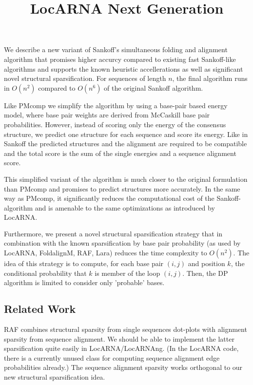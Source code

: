 \documentclass{article}
\title{LocARNA Next Generation}
\begin{document}
\maketitle

We describe a new variant of Sankoff's simultaneous folding and
alignment algorithm that promises higher accurcy compared to existing
fast Sankoff-like algorithms and supports the known heuristic
accellerations as well as significant novel structural
sparsification. For sequences of length $n$, the final algorithm runs
in $O(n^2)$ compared to $O(n^6)$ of the original Sankoff algorithm.

Like PMcomp we simplify the algorithm by using a base-pair based
energy model, where base pair weights are derived from McCaskill base
pair probabilities. However, instead of scoring only the energy of the
consensus structure, we predict one structure for each sequence and
score its energy. Like in Sankoff the predicted structures and the
alignment are required to be compatible and the total score is the sum
of the single energies and a sequence alignment score.
  
This simplified variant of the algorithm is much closer to the
original formulation than PMcomp and promises to predict structures
more accurately. In the same way as PMcomp, it significantly reduces
the computational cost of the Sankoff-algorithm and is amenable to the
same optimizations as introduced by LocARNA.

Furthermore, we present a novel structural sparsification strategy
that in combination with the known sparsification by base pair
probability (as used by LocARNA, FoldalignM, RAF, Lara) reduces the
time complexity to $O(n^2)$. The idea of this strategy is to compute,
for each base pair $(i,j)$ and position $k$, the conditional
probability that $k$ is member of the loop $(i,j)$. Then, the DP
algorithm is limited to consider only 'probable' bases.

\subsection*{Related Work}

 RAF combines structural sparsity from
single sequences dot-plots with alignment sparsity from sequence
alignment. We should be able to implement the latter sparsification
quite easily in LocARNA/LocARNAng.  (In the LocARNA code, there is a
currently unused class for computing sequence alignment edge
probabilities already.) The sequence alignment sparsity works
orthogonal to our new structural sparsification idea.
\end{document}
